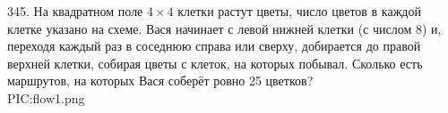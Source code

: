 345. На квадратном поле $4\times4$ клетки растут цветы, число цветов в каждой клетке указано на схеме. Вася начинает с левой нижней клетки (с числом 8) и, переходя каждый раз в соседнюю справа или сверху, добирается до правой верхней клетки, собирая цветы с клеток, на которых побывал. Сколько есть маршрутов, на которых Вася соберёт ровно 25 цветков?\\
{{PIC:flow1.png}}\\

